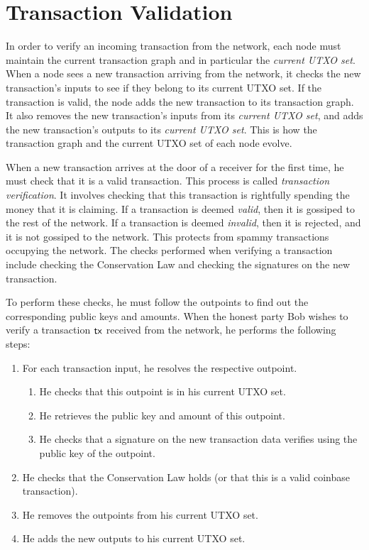 \section{Transaction Validation}\label{sec.transaction.validation}

In order to verify an incoming transaction from the network, each node must maintain the current transaction
graph and in particular the \emph{current UTXO set}.
When a node sees a new transaction arriving from
the network, it checks the new transaction's inputs to see if they belong to its current UTXO set.
If the transaction is valid, the node adds the new transaction to its transaction graph.
It also removes the new transaction's inputs
from its \emph{current UTXO set}, and adds the new transaction's outputs to its \emph{current UTXO set}.
This is how the transaction graph and the current UTXO set of each node evolve.

When a new transaction arrives at the door of a receiver for the first time, he must check that it is
a valid transaction. This process is called \emph{transaction verification}. It involves checking that
this transaction is rightfully spending the money that it is claiming. If a transaction is deemed \emph{valid},
then it is gossiped to the rest of the network. If a transaction is deemed \emph{invalid}, then it is
rejected, and it is not gossiped to the network. This protects from spammy transactions occupying the
network. The checks performed when verifying a transaction include checking the Conservation Law
and checking the signatures on the new transaction.

To perform these checks, he must follow the outpoints to find out the corresponding
public keys and amounts. When the honest party  Bob wishes to verify a transaction $\mathsf{tx}$ received from
the network, he performs the following steps:

\begin{enumerate}
  \item For each transaction input, he resolves the respective outpoint.
  \begin{enumerate}
    \item He checks that this outpoint is in his current UTXO set. \label{enum.tx-double-spend}
    \item He retrieves the public key and amount of this outpoint.
    \item He checks that a signature on the new transaction data verifies using the public key of the outpoint.
  \end{enumerate}
  \item He checks that the Conservation Law holds (or that this is a valid coinbase transaction).
  \item He removes the outpoints from his current UTXO set.
  \item He adds the new outputs to his current UTXO set.
\end{enumerate}

